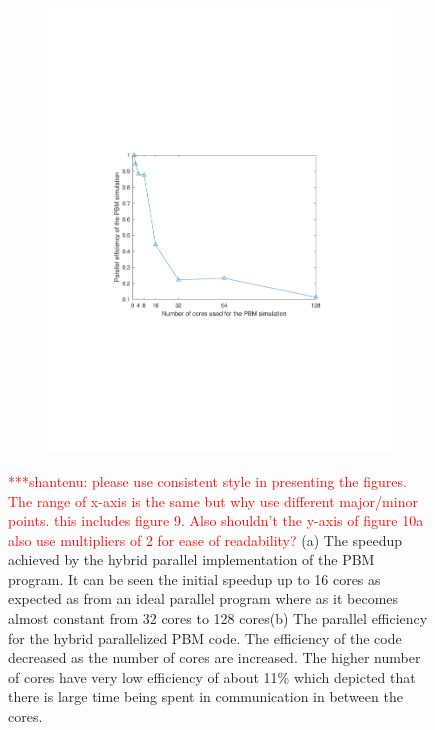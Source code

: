 \documentclass[preprint,11pt,authoryear]{elsarticle}
\newcommand{\jhanote}[1]{ {\textcolor{red} { ***shantenu: #1 }}}
\newcommand{\jhanote}[1]{ {\textcolor{red} { ***shantenu: #1 }}}
\begin{document}
\begin{figure}
\begin{subfigure}{.45\textwidth}
\includegraphics[scale=0.55]{rslsts_PBM_efficiency.pdf}
\caption{}
\label{fig:rslts_PBM_parallel_efficiency}
\end{subfigure}

\caption{\jhanote{please use consistent style in presenting the figures. The range of x-axis is the same but why use different major/minor points. this includes figure 9. Also shouldn't the y-axis of figure 10a also use multipliers of 2 for ease of readability?}(a) 
The speedup achieved by the hybrid parallel implementation of the PBM program.
It can be seen the initial speedup up to 16 cores as expected as from an ideal
parallel program where as it becomes almost constant from 32 cores to 128
cores(b) The parallel efficiency for the hybrid parallelized PBM code. The
efficiency of the code decreased as the number of cores are increased. The
higher number of cores have very low efficiency of about 11\% which depicted
that there is large time being spent in communication in between the cores.}
\end{figure}     
\end{document}
